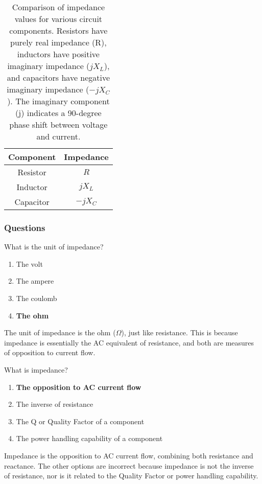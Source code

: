 \begin{table}[h]
    \centering
    \begin{tabular}{|c|c|}
        \hline
        \textbf{Component} & \textbf{Impedance} \\
        \hline
        Resistor & \( R \) \\
        Inductor & \( jX_L \) \\
        Capacitor & \( -jX_C \) \\
        \hline
    \end{tabular}
    \caption{Comparison of impedance values for various circuit components. Resistors have purely real impedance (R), inductors have positive imaginary impedance (\(jX_L\)), and capacitors have negative imaginary impedance (\(-jX_C\)). The imaginary component (j) indicates a 90-degree phase shift between voltage and current.}
    \label{tab:impedance-values}
\end{table}

\subsubsection{Questions}
\begin{tcolorbox}[colback=gray!10!white,colframe=black!75!black,title={T5C05}]
    What is the unit of impedance?
    \begin{enumerate}[label=\Alph*),noitemsep]
        \item The volt
        \item The ampere
        \item The coulomb
        \item \textbf{The ohm}
    \end{enumerate}
\end{tcolorbox}
The unit of impedance is the ohm (\( \Omega \)), just like resistance. This is because impedance is essentially the AC equivalent of resistance, and both are measures of opposition to current flow.

\begin{tcolorbox}[colback=gray!10!white,colframe=black!75!black,title={T5C12}]
    What is impedance?
    \begin{enumerate}[label=\Alph*),noitemsep]
        \item \textbf{The opposition to AC current flow}
        \item The inverse of resistance
        \item The Q or Quality Factor of a component
        \item The power handling capability of a component
    \end{enumerate}
\end{tcolorbox}
Impedance is the opposition to AC current flow, combining both resistance and reactance. The other options are incorrect because impedance is not the inverse of resistance, nor is it related to the Quality Factor or power handling capability.


